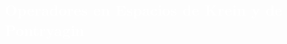 \begin{titlepage}
\author{%
\\
    Boris Lora Castro\\
     Universidad del Atl\'antico\\
      \texttt{\footnotesize
       borisjose62@gmail.com}\vspace{10pt}\\
          William Vides Ramos\\
    Universidad de la Guajira\\
         }
\newcommand{\N}{\mathbb{N}}
\newcommand{\R}{\mathbb{R}}
\newcommand{\Z}{\mathbb{Z}}
\newcommand{\Bd}{\mathrm{Bd}}
\newcommand{\Int}{\mathrm{Int}}
\newcommand{\diam}{\mathrm{diam}}
\newcommand{\Cl}{\mathrm{Cl}}
\newcommand{\A}{\mathrm{A}}

\pagecolor{white}
\BgThispage
{}
\vspace*{-1.1cm}
\noindent
\def\titulo#1{\section{#1}}
\section{\bf\large\textcolor{white}{Operadores en Espacios de Krein y de Pontryagin}}
\vspace*{2cm}\par
\noindent


\end{titlepage}
